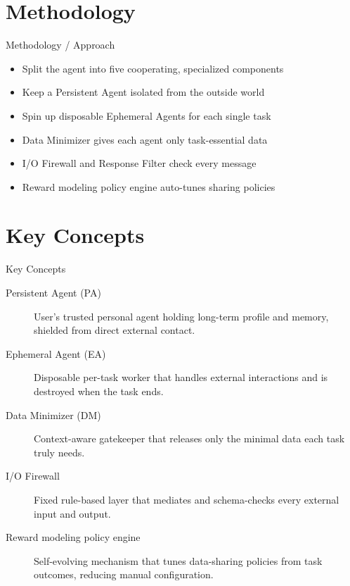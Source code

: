 \documentclass[10pt]{beamer}
\begin{document}
\section{Methodology}
\begin{frame}[allowframebreaks]{Methodology / Approach}
\begin{itemize}
  \item Split the agent into five cooperating, specialized components
  \item Keep a Persistent Agent isolated from the outside world
  \item Spin up disposable Ephemeral Agents for each single task
  \item Data Minimizer gives each agent only task-essential data
  \item I/O Firewall and Response Filter check every message
  \item Reward modeling policy engine auto-tunes sharing policies
\end{itemize}
\end{frame}

\section{Key Concepts}
\begin{frame}[allowframebreaks]{Key Concepts}
  \begin{description}
    \item[Persistent Agent (PA)] User's trusted personal agent holding long-term profile and memory, shielded from direct external contact.
    \item[Ephemeral Agent (EA)] Disposable per-task worker that handles external interactions and is destroyed when the task ends.
    \item[Data Minimizer (DM)] Context-aware gatekeeper that releases only the minimal data each task truly needs.
    \item[I/O Firewall] Fixed rule-based layer that mediates and schema-checks every external input and output.
    \item[Reward modeling policy engine] Self-evolving mechanism that tunes data-sharing policies from task outcomes, reducing manual configuration.
  \end{description}
\end{frame}
\end{document}
